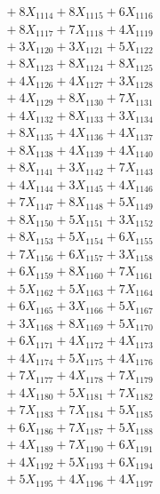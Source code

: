 \documentclass[a4paper,10pt]{article}
\begin{document}
{\begin{align}
&\;  + 8 X_{1114} + 8 X_{1115} + 6 X_{1116} \\[0.3ex]
&\;  + 8 X_{1117} + 7 X_{1118} + 4 X_{1119} \\[0.5ex]\allowbreak
&\;  + 3 X_{1120} + 3 X_{1121} + 5 X_{1122} \\[0.3ex]
&\;  + 8 X_{1123} + 8 X_{1124} + 8 X_{1125} \\[0.3ex]
&\;  + 4 X_{1126} + 4 X_{1127} + 3 X_{1128} \\[0.3ex]
&\;  + 4 X_{1129} + 8 X_{1130} + 7 X_{1131} \\[0.3ex]
&\;  + 4 X_{1132} + 8 X_{1133} + 3 X_{1134} \\[0.3ex]
&\;  + 8 X_{1135} + 4 X_{1136} + 4 X_{1137} \\[0.3ex]
&\;  + 8 X_{1138} + 4 X_{1139} + 4 X_{1140} \\[0.3ex]
&\;  + 8 X_{1141} + 3 X_{1142} + 7 X_{1143} \\[0.3ex]
&\;  + 4 X_{1144} + 3 X_{1145} + 4 X_{1146} \\[0.3ex]
&\;  + 7 X_{1147} + 8 X_{1148} + 5 X_{1149} \\[0.5ex]\allowbreak
&\;  + 8 X_{1150} + 5 X_{1151} + 3 X_{1152} \\[0.3ex]
&\;  + 8 X_{1153} + 5 X_{1154} + 6 X_{1155} \\[0.3ex]
&\;  + 7 X_{1156} + 6 X_{1157} + 3 X_{1158} \\[0.3ex]
&\;  + 6 X_{1159} + 8 X_{1160} + 7 X_{1161} \\[0.3ex]
&\;  + 5 X_{1162} + 5 X_{1163} + 7 X_{1164} \\[0.3ex]
&\;  + 6 X_{1165} + 3 X_{1166} + 5 X_{1167} \\[0.3ex]
&\;  + 3 X_{1168} + 8 X_{1169} + 5 X_{1170} \\[0.3ex]
&\;  + 6 X_{1171} + 4 X_{1172} + 4 X_{1173} \\[0.3ex]
&\;  + 4 X_{1174} + 5 X_{1175} + 4 X_{1176} \\[0.3ex]
&\;  + 7 X_{1177} + 4 X_{1178} + 7 X_{1179} \\[0.5ex]\allowbreak
&\;  + 4 X_{1180} + 5 X_{1181} + 7 X_{1182} \\[0.3ex]
&\;  + 7 X_{1183} + 7 X_{1184} + 5 X_{1185} \\[0.3ex]
&\;  + 6 X_{1186} + 7 X_{1187} + 5 X_{1188} \\[0.3ex]
&\;  + 4 X_{1189} + 7 X_{1190} + 6 X_{1191} \\[0.3ex]
&\;  + 4 X_{1192} + 5 X_{1193} + 6 X_{1194} \\[0.3ex]
&\;  + 5 X_{1195} + 4 X_{1196} + 4 X_{1197} \\[0.3ex]

\end{align}}
\end{document}
